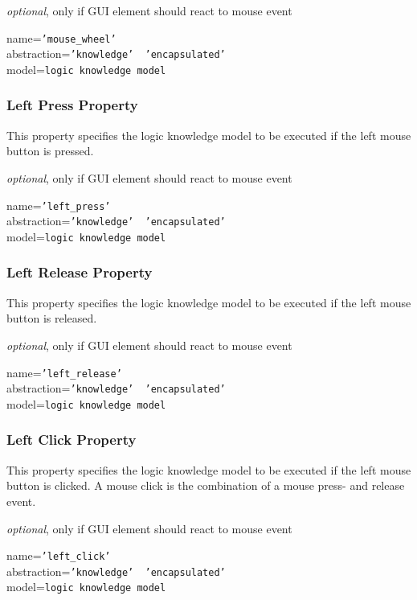 \emph{optional}, only if GUI element should react to mouse event

name=\texttt{'mouse\_wheel'}\\
abstraction=\texttt{'knowledge' \vline\ 'encapsulated'}\\
model=\texttt{logic knowledge model}

\subsubsection{Left Press Property}

This property specifies the logic knowledge model to be executed if the left
mouse button is pressed.

\emph{optional}, only if GUI element should react to mouse event

name=\texttt{'left\_press'}\\
abstraction=\texttt{'knowledge' \vline\ 'encapsulated'}\\
model=\texttt{logic knowledge model}

\subsubsection{Left Release Property}

This property specifies the logic knowledge model to be executed if the left
mouse button is released.

\emph{optional}, only if GUI element should react to mouse event

name=\texttt{'left\_release'}\\
abstraction=\texttt{'knowledge' \vline\ 'encapsulated'}\\
model=\texttt{logic knowledge model}

\subsubsection{Left Click Property}

This property specifies the logic knowledge model to be executed if the left
mouse button is clicked. A mouse click is the combination of a mouse press- and
release event.

\emph{optional}, only if GUI element should react to mouse event

name=\texttt{'left\_click'}\\
abstraction=\texttt{'knowledge' \vline\ 'encapsulated'}\\
model=\texttt{logic knowledge model}
